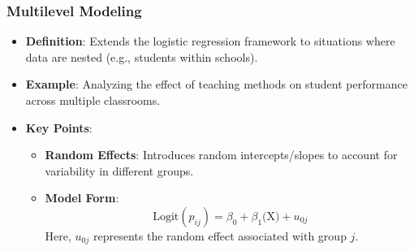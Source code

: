 \documentclass[aspectratio=169]{beamer}
\begin{document}
\begin{frame}[fragile]
    \frametitle{Multilevel Modeling}
    \begin{itemize}
        \item \textbf{Definition}: Extends the logistic regression framework to situations where data are nested (e.g., students within schools).
        \item \textbf{Example}: Analyzing the effect of teaching methods on student performance across multiple classrooms.
        \item \textbf{Key Points}:
        \begin{itemize}
            \item \textbf{Random Effects}: Introduces random intercepts/slopes to account for variability in different groups.
            \item \textbf{Model Form}:
            \begin{equation}
                \text{Logit}(p_{ij}) = \beta_0 + \beta_1 \text{(X)} + u_{0j}
            \end{equation}
            Here, \(u_{0j}\) represents the random effect associated with group \(j\).
        \end{itemize}
    \end{itemize}
\end{frame}
\end{document}
